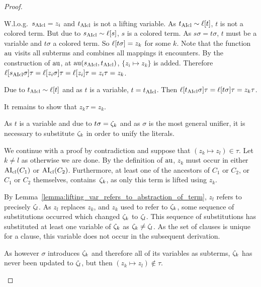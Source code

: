 \documentclass[,%
	paper=a4,%
	DIV10, %
	twoside=false,%
	liststotoc,
	bibtotoc,
	draft=false,%
	numbers=noendperiod
]{scrartcl}
\begin{document}
\begin{proof}
\begin{description}
\begin{compactitem}
			\item W.l.o.g.~$s_{\operatorname{AIcl}} = z_i$ and $t_{\operatorname{AIcl}}$ is not a lifting variable.
				As $t_{\operatorname{AIcl}} \sim \ell[t]$, $t$ is not a colored term.
				But due to $s_{\operatorname{AIcl}} \sim \ell[s]$, $s$ is a colored term.
				As $s\sigma = t\sigma$, $t$ must be a variable and $t\sigma$ a colored term.
				So $\ell[t\sigma] = z_k$ for some $k$.
				Note that the function $\operatorname{au}$ visits all subterms and combines all mappings it encounters.
				By the construction of $\operatorname{au}$, at $\operatorname{au}(s_{\operatorname{AIcl}}, t_{\operatorname{AIcl}})$, $\{ z_i \mapsto z_k \}$ is added.
				Therefore $\ell[s_{\operatorname{AIcl}}\sigma]\tau = \ell[z_i\sigma]\tau = \ell[z_i]\tau = z_i\tau = z_k$.

				Due to $t_{\operatorname{AIcl}} \sim \ell[t]$ and as $t$ is a variable, $t=t_{\operatorname{AIcl}}$.
				Then $\ell[t_{\operatorname{AIcl}}\sigma]\tau = \ell[t\sigma]\tau = z_k\tau$.

				It remains to show that $z_k\tau = z_k$.

				As $t$ is a variable and due to $t\sigma = \zeta_{k}$ and as $\sigma$ is the most general unifier, it is necessary to substitute $\zeta_{k}$ in order to unify the literals. 

				We continue with a proof by contradiction and suppose that $(z_k \mapsto z_l) \in \tau$. Let $k\neq l$ as otherwise we are done.
				By the definition of $\operatorname{au}$, $z_k$ must occur in either $\operatorname{AI}_\mathrm{cl}(C_1)$ or $\operatorname{AI}_\mathrm{cl}(C_2)$.
				 Furthermore, at least one of the ancestors of $C_1$ or $C_2$, or $C_1$ or $C_2$ themselves, contains~$\zeta_{k}$, as only this term is lifted using $z_k$.

				By Lemma~\ref{lemma:lifting_var_refers_to_abstraction_of_term}, $z_l$ refers to precisely $\zeta_{l}$. %
				As $z_l$ replaces $z_k$, and $z_k$ used to refer to $\zeta_{k}$,
				some sequence of substitutions occurred which changed $\zeta_{k}$ to $\zeta_{l}$.
				This sequence of substitutions has substituted at least one variable of $\zeta_{k}$ as $\zeta_{k}\neq\zeta_{l}$.
				As the set of clauses is unique for a clause, this variable does not occur in the subsequent derivation.

				As however $\sigma$ introduces $\zeta_{k}$ and therefore all of its variables as subterms, 
				$\zeta_{k}$ has never been updated to $\zeta_{l}$, but then $(z_k \mapsto z_l) \not\in \tau$.


\end{compactitem}
\end{description}
\end{proof}
\end{document}
